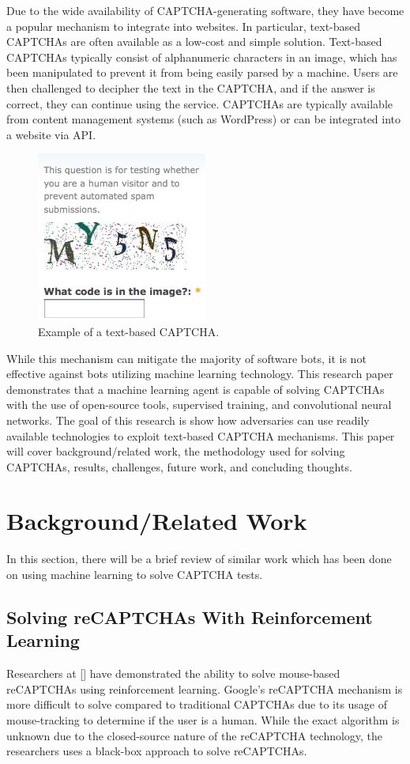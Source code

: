 \documentclass[11pt,conference]{IEEEtran}
\begin{document}
Due to the wide availability of CAPTCHA-generating software, they have become a popular
mechanism to integrate into websites. In particular, text-based CAPTCHAs are
often available as a low-cost and simple solution. Text-based CAPTCHAs
typically consist of alphanumeric characters in an image, which has been
manipulated to prevent it from being easily parsed by a machine. Users are then
challenged to decipher the text in the CAPTCHA, and if the answer is correct,
they can continue using the service. CAPTCHAs are typically available from
content management systems (such as WordPress) or can be integrated into a
website via API.

\begin{figure}[htbp]
	\centerline{\includegraphics[scale=0.7]{images/alphanumeric-captcha.png}}
	\caption{Example of a text-based CAPTCHA.}
	\label{figure}
\end{figure}

While this mechanism can mitigate the majority of software bots, it is not
effective against bots utilizing machine learning technology. This research
paper demonstrates that a machine learning agent is capable of solving CAPTCHAs
with the use of open-source tools, supervised training, and convolutional
neural networks. The goal of this research is show how adversaries can use
readily available technologies to exploit text-based CAPTCHA mechanisms.
This paper will cover background/related work, the methodology  used for
solving CAPTCHAs, results, challenges, future work, and concluding thoughts.

\section{Background/Related Work}
In this section, there will be a brief review of similar work which has been
done on using machine learning to solve CAPTCHA tests.

\subsection{Solving reCAPTCHAs With Reinforcement Learning}
Researchers at [] have demonstrated the ability to solve mouse-based reCAPTCHAs using
reinforcement learning. Google's reCAPTCHA mechanism is more difficult to solve
compared to traditional CAPTCHAs due to its usage of mouse-tracking to
determine if the user is a human. While the exact algorithm is unknown due to
the closed-source nature of the reCAPTCHA technology, the researchers uses a
black-box approach to solve reCAPTCHAs.
\end{document}
